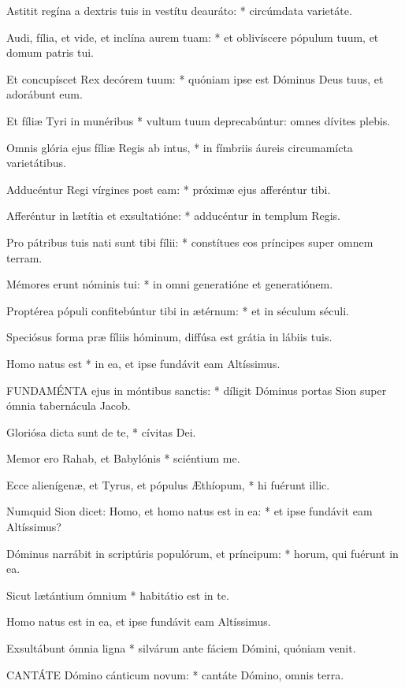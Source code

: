 Astitit regína a dextris tuis in vestítu deauráto: * circúmdata varietáte.

Audi, fília, et vide, et inclína aurem tuam: * et oblivíscere pópulum tuum, et domum patris tui.

Et concupíscet Rex decórem tuum: * quóniam ipse est Dóminus Deus tuus, et adorábunt eum.

Et fíliæ Tyri in munéribus * vultum tuum deprecabúntur: omnes dívites plebis.

Omnis glória ejus fíliæ Regis ab intus, * in fímbriis áureis circumamícta varietátibus.

Adducéntur Regi vírgines post eam: * próximæ ejus afferéntur tibi.

Afferéntur in lætítia et exsultatióne: * adducéntur in templum Regis.

Pro pátribus tuis nati sunt tibi fílii: * constítues eos príncipes super omnem terram.

Mémores erunt nóminis tui: * in omni generatióne et generatiónem.

Proptérea pópuli confitebúntur tibi in ætérnum: * et in séculum séculi.

 Speciósus forma præ fíliis hóminum, diffúsa est grátia in lábiis tuis.

 Homo natus est * in ea, et ipse fundávit eam Altíssimus.


\lettrine[lines=2]{F}{UNDAMÉNTA} ejus in móntibus sanctis: * díligit Dóminus portas Sion super ómnia tabernácula Jacob.

Gloriósa dicta sunt de te, * cívitas Dei.

Memor ero Rahab, et Babylónis * sciéntium me.

Ecce alienígenæ, et Tyrus, et pópulus Æthíopum, * hi fuérunt illic.

Numquid Sion dicet: Homo, et homo natus est in ea: * et ipse fundávit eam Altíssimus?

Dóminus narrábit in scriptúris populórum, et príncipum: * horum, qui fuérunt in ea.

Sicut lætántium ómnium * habitátio est in te.

 Homo natus est in ea, et ipse fundávit eam Altíssimus.

 Exsultábunt ómnia ligna * silvárum ante fáciem Dómini, quóniam venit.


\lettrine[lines=2]{C}{ANTÁTE} Dómino cánticum novum: * cantáte Dómino, omnis terra.

